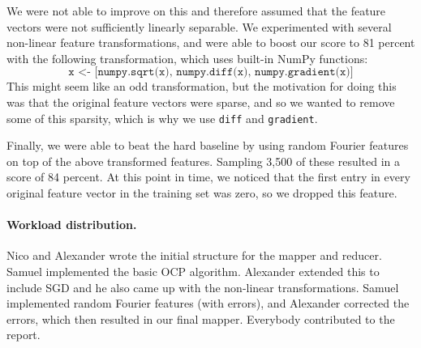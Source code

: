 \documentclass[a4paper, 11pt]{article}
\begin{document}
We were not able to improve on this and therefore assumed that the feature vectors were not sufficiently
linearly separable. We experimented with several non-linear feature transformations, and were able to boost our score to 81 percent with the following transformation, which uses built-in NumPy functions:
\begin{equation*}
\texttt{x <- [numpy.sqrt(x), numpy.diff(x), numpy.gradient(x)]}
\end{equation*}
This might seem like an odd transformation, but the motivation for doing this was that the original feature vectors were sparse, and so we wanted to remove some of this sparsity, which is why we use \texttt{diff} and \texttt{gradient}.

Finally, we were able to beat the hard baseline by using random Fourier features on top of the above transformed features. Sampling 3,500 of these resulted in a score of 84 percent. At this point in time, we noticed that the first entry in every original feature vector in the training set was zero, so we dropped this feature.

\paragraph{Workload distribution.\!\!\!}
Nico and Alexander wrote the initial structure for the mapper and reducer. Samuel implemented the basic OCP algorithm. Alexander extended this to include SGD and he also came up with the non-linear transformations. Samuel implemented random Fourier features (with errors), and Alexander corrected the errors, which then resulted in our final mapper. Everybody contributed to the report.
\end{document}
